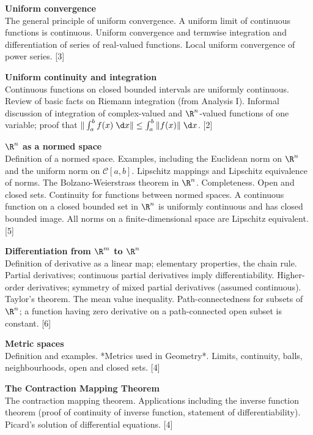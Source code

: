 \documentclass[a4paper]{article}
\begin{document}
\maketitle
{\small
\noindent\textbf{Uniform convergence}\\
The general principle of uniform convergence. A uniform limit of continuous functions is continuous. Uniform convergence and termwise integration and differentiation of series of real-valued functions. Local uniform convergence of power series.\hspace*{\fill} [3]

\vspace{10pt}
\noindent\textbf{Uniform continuity and integration}\\
Continuous functions on closed bounded intervals are uniformly continuous. Review of basic facts on Riemann integration (from Analysis I). Informal discussion of integration of complex-valued and $\R^n$-valued functions of one variable; proof that $\|\int_a^b f(x) \;\d x\| \leq \int_a^b \|f(x)\|\;\d x$.\hspace*{\fill} [2]

\vspace{10pt}
\noindent\textbf{$\R^n$ as a normed space}\\
Definition of a normed space. Examples, including the Euclidean norm on $\R^n$ and the uniform norm on $\mathcal{C}[a, b]$. Lipschitz mappings and Lipschitz equivalence of norms. The Bolzano-Weierstrass theorem in $\R^n$. Completeness. Open and closed sets. Continuity for functions between normed spaces. A continuous function on a closed bounded set in $\R^n$ is uniformly continuous and has closed bounded image. All norms on a finite-dimensional space are Lipschitz equivalent.\hspace*{\fill} [5]

\vspace{10pt}
\noindent\textbf{Differentiation from $\R^m$ to $\R^n$}\\
Definition of derivative as a linear map; elementary properties, the chain rule. Partial derivatives; continuous partial derivatives imply differentiability. Higher-order derivatives; symmetry of mixed partial derivatives (assumed continuous). Taylor's theorem. The mean value inequality. Path-connectedness for subsets of $\R^n$; a function having zero derivative on a path-connected open subset is constant.\hspace*{\fill} [6]

\vspace{10pt}
\noindent\textbf{Metric spaces}\\
Definition and examples. *Metrics used in Geometry*. Limits, continuity, balls, neighbourhoods, open and closed sets.\hspace*{\fill} [4]

\vspace{10pt}
\noindent\textbf{The Contraction Mapping Theorem}\\
The contraction mapping theorem. Applications including the inverse function theorem (proof of continuity of inverse function, statement of differentiability). Picard's solution of differential equations.\hspace*{\fill} [4]}
\end{document}
